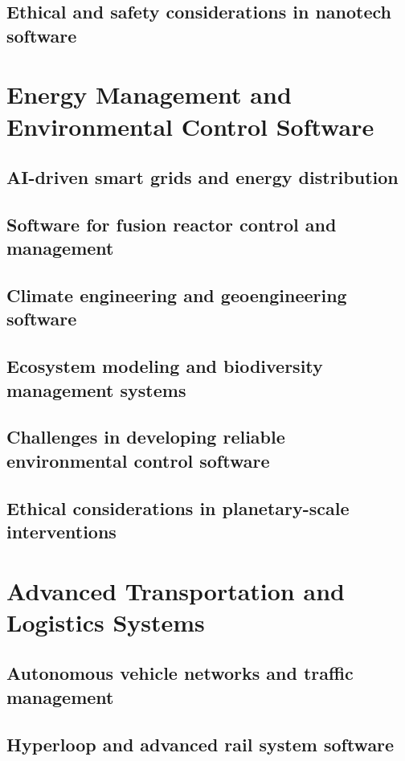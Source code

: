 \subsection{Ethical and safety considerations in nanotech software}

\newpage

\section{Energy Management and Environmental Control Software}
\subsection{AI-driven smart grids and energy distribution}
\subsection{Software for fusion reactor control and management}
\subsection{Climate engineering and geoengineering software}
\subsection{Ecosystem modeling and biodiversity management systems}
\subsection{Challenges in developing reliable environmental control software}
\subsection{Ethical considerations in planetary-scale interventions}

\newpage

\section{Advanced Transportation and Logistics Systems}
\subsection{Autonomous vehicle networks and traffic management}
\subsection{Hyperloop and advanced rail system software}
